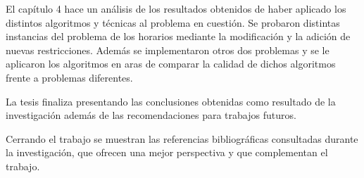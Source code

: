 \begin{introduction}
El cap\'itulo 4 hace un an\'alisis de los resultados obtenidos de haber aplicado los distintos algoritmos y t\'ecnicas al problema en cuesti\'on. Se probaron distintas instancias del problema de los horarios mediante la modificaci\'on y la adici\'on de nuevas restricciones. Adem\'as se implementaron otros dos problemas y se le aplicaron los algoritmos en aras de comparar la calidad de dichos algoritmos frente a problemas diferentes.

La tesis finaliza presentando las conclusiones obtenidas como resultado de la investigación además de las recomendaciones para trabajos futuros.

Cerrando el trabajo se muestran las referencias bibliográficas consultadas durante la investigación, que ofrecen una mejor perspectiva y que complementan el trabajo.

\end{introduction}
